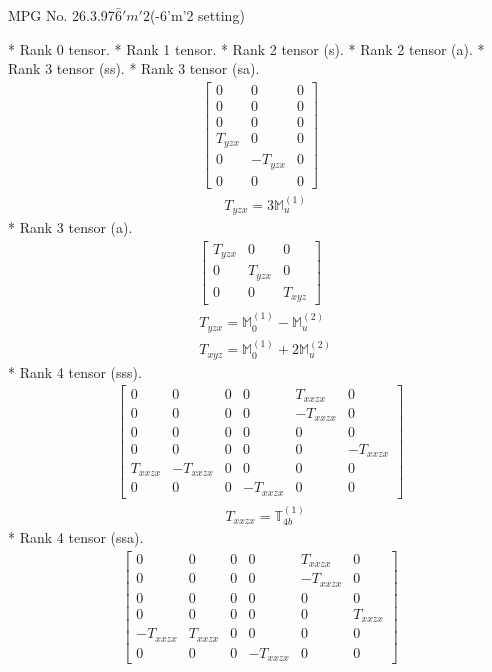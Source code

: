 \documentclass[fleqn,8pt,landscape]{jsarticle}
\begin{document}
\setcounter{MaxMatrixCols}{32}

\renewcommand{\tablename}{Table~}
\renewcommand{\figurename}{Figure~}
\begin{center}
\LARGE
MPG No. 26.3.97\quad$\bar{6}'m'2$\quad(-6'm'2 setting)
\end{center}
* Rank 0 tensor.
* Rank 1 tensor.
* Rank 2 tensor (s).
* Rank 2 tensor (a).
* Rank 3 tensor (ss).
* Rank 3 tensor (sa).
\begin{align*}
\begin{bmatrix} 0 & 0 & 0 \\ 0 & 0 & 0 \\ 0 & 0 & 0 \\ T_{yzx} & 0 & 0 \\ 0 & - T_{yzx} & 0 \\ 0 & 0 & 0 \end{bmatrix}
\end{align*}
\begin{align*}
& T_{yzx} = 3 \mathbb{M}_{u}^{(1)}
\end{align*}
* Rank 3 tensor (a).
\begin{align*}
\begin{bmatrix} T_{yzx} & 0 & 0 \\ 0 & T_{yzx} & 0 \\ 0 & 0 & T_{xyz} \end{bmatrix}
\end{align*}
\begin{align*}
& T_{yzx} = \mathbb{M}_{0}^{(1)} - \mathbb{M}_{u}^{(2)} \\
& T_{xyz} = \mathbb{M}_{0}^{(1)} + 2 \mathbb{M}_{u}^{(2)}
\end{align*}
* Rank 4 tensor (sss).
\begin{align*}
\begin{bmatrix} 0 & 0 & 0 & 0 & T_{xxzx} & 0 \\ 0 & 0 & 0 & 0 & - T_{xxzx} & 0 \\ 0 & 0 & 0 & 0 & 0 & 0 \\ 0 & 0 & 0 & 0 & 0 & - T_{xxzx} \\ T_{xxzx} & - T_{xxzx} & 0 & 0 & 0 & 0 \\ 0 & 0 & 0 & - T_{xxzx} & 0 & 0 \end{bmatrix}
\end{align*}
\begin{align*}
& T_{xxzx} = \mathbb{T}_{4b}^{(1)}
\end{align*}
* Rank 4 tensor (ssa).
\begin{align*}
\begin{bmatrix} 0 & 0 & 0 & 0 & T_{xxzx} & 0 \\ 0 & 0 & 0 & 0 & - T_{xxzx} & 0 \\ 0 & 0 & 0 & 0 & 0 & 0 \\ 0 & 0 & 0 & 0 & 0 & T_{xxzx} \\ - T_{xxzx} & T_{xxzx} & 0 & 0 & 0 & 0 \\ 0 & 0 & 0 & - T_{xxzx} & 0 & 0 \end{bmatrix}
\end{align*}
\end{document}
